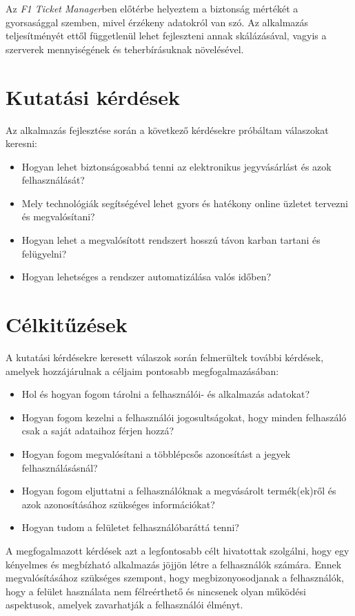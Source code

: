 Az \textit{F1 Ticket Manager}ben előtérbe helyeztem a biztonság mértékét a gyorsasággal szemben, mivel érzékeny adatokról van szó. Az alkalmazás teljesítményét ettől függetlenül lehet fejleszteni annak skálázásával, vagyis a szerverek mennyiségének és teherbírásuknak növelésével.

\section {Kutatási kérdések} \label{research}

Az alkalmazás fejlesztése során a következő kérdésekre próbáltam válaszokat keresni:
\begin{itemize}
	\item Hogyan lehet biztonságosabbá tenni az elektronikus jegyvásárlást és azok felhasználását?
	\item Mely technológiák segítségével lehet gyors és hatékony online üzletet tervezni és megvalósítani?
	\item Hogyan lehet a megvalósított rendszert hosszú távon karban tartani és felügyelni?
	\item Hogyan lehetséges a rendszer automatizálása valós időben?
\end{itemize}

\section {Célkitűzések} \label{scopes}

A kutatási kérdésekre keresett válaszok során felmerültek további kérdések, amelyek hozzájárulnak a céljaim pontosabb megfogalmazásában:
\begin{itemize}
	\item Hol és hogyan fogom tárolni a felhasználói- és alkalmazás adatokat?
	\item Hogyan fogom kezelni a felhasználói jogosultságokat, hogy minden felhaszáló csak a saját adataihoz férjen hozzá?
	\item Hogyan fogom megvalósítani a többlépcsős azonosítást a jegyek felhasználásásnál?
	\item Hogyan fogom eljuttatni a felhasználóknak a megvásárolt termék(ek)ről és azok azonosításához szükséges információkat? 
	\item Hogyan tudom a felületet felhasználóbaráttá tenni?
\end{itemize}

A megfogalmazott kérdések azt a legfontosabb célt hivatottak szolgálni, hogy egy kényelmes és megbízható alkalmazás jöjjön létre a felhasználók számára. Ennek megvalósításához szükséges szempont, hogy megbizonyosodjanak a felhasználók, hogy a felület használata nem félreérthető és nincsenek olyan működési aspektusok, amelyek zavarhatják a felhasználói élményt.

